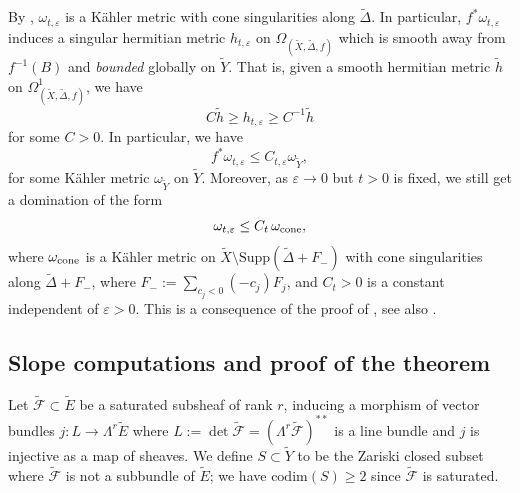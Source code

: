 \documentclass[12pt]{amsart}
\theoremstyle{definition}
\newcommand{\tX}{\widetilde{X}}
\newcommand{\tY}{\widetilde{Y}}
\newcommand{\tE}{\widetilde{E}}
\newcommand{\Supp}{\mathrm{Supp}}
\numberwithin{equation}{section}
\newcommand{\tF}{\widetilde{\mathcal{F}}}
\newcommand{\tDe}{\widetilde \Delta}
\newcommand{\ep}{\varepsilon}
\begin{document}
By \cite[Theorem~A]{GP-conic}, $\omega_{t,\ep}$ is a K\"ahler metric with cone singularities along $\tDe$. In particular, $f^*\omega_{t,\ep}$ induces a singular hermitian metric $h_{t,\ep}$ on $\Omega_{(\tX, \tDe, f)}$ which is smooth away from $f^{-1}(B)$ and {\it bounded} globally on $\tY$. That is, given a smooth hermitian metric $\tilde h$ on $\Omega_{(\tX, \tDe, f)}^1$, we have 
\begin{equation}
\label{bounded}
C\tilde h \ge h_{t,\ep}\ge C^{-1}\tilde h
\end{equation} for some $C>0$. In particular, we have 
\begin{equation}
\label{upper bound 0}
f^*\omega_{t,\ep} \le C_{t, \ep}  \omega_{\tY},
\end{equation}
for some K\"ahler metric $\omega_{\tY}$ on $\tY$. Moreover, as $\ep\to 0$ but $t>0$ is fixed, we still get a domination of the form
\begin{equation}
\label{upper bound}
\omega_{t,\ep} \le C_t \, \omega_{\rm cone},
\end{equation}
where $\omega_{\rm cone}$ is a K\"ahler metric on $\tX\setminus \Supp(\tDe+F_-)$ with cone singularities along $\tDe+F_-$, where $F_-:=\sum_{c_j<0}(-c_j)F_j$, and $C_t>0$ is a constant independent of $\ep>0$. This is a consequence of the proof of \cite[Theorem~2]{GP-conic}, see also \cite[Proposition~4.1]{G12}.

\subsection{Slope computations and proof of the theorem}
\label{slope}
 Let $\tF\subset \tE$ be a saturated subsheaf of rank $r$, inducing a morphism of vector bundles $j:L\to \Lambda^r\tE$ where $L:=\det\tF=(\Lambda^r \tF)^{**}$ is a line bundle and $j$ is injective as a map of sheaves. We define $S\subset \tY$ to be the Zariski closed subset where $\tF$ is not a subbundle of $\tE$; we have $\mathrm{codim}(S)\ge 2$ since $\tF$ is saturated. 
 
\end{document}

